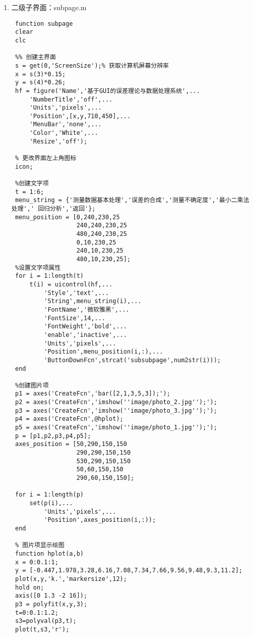 \begin{enumerate}
\begin{lstlisting}
 % 显示学校名称PNG图片函数
 function school_logo(a,b)
 [I,c,alpha] = imread('image/school_logo.png');
 h = imshow(I);
 set(h,'AlphaData',alpha);
 
 %% 主界面退出对话框
 function hexit(a,b)
 he = questdlg('你确定退出吗？','退出程序','是','否','否');
 if strcmp(he,'是')
     close;
     clear;
     clc;
 end;\end{lstlisting}
 \newpage
	\item 二级子界面：subpage.m
	\begin{lstlisting}
 function subpage
 clear
 clc
 
 %% 创建主界面
 s = get(0,'ScreenSize');% 获取计算机屏幕分辨率
 x = s(3)*0.15;
 y = s(4)*0.26;
 hf = figure('Name','基于GUI的误差理论与数据处理系统',...
     'NumberTitle','off',...
     'Units','pixels',...
     'Position',[x,y,710,450],...
     'MenuBar','none',...
     'Color','White',...
     'Resize','off');
 
 % 更改界面左上角图标
 icon;
 
 %创建文字项
 t = 1:6;
 menu_string = {'测量数据基本处理','误差的合成','测量不确定度','最小二乘法处理',' 回归分析','返回'};
 menu_position = [0,240,230,25
                  240,240,230,25
                  480,240,230,25
                  0,10,230,25
                  240,10,230,25
                  480,10,230,25];
 %设置文字项属性
 for i = 1:length(t)
     t(i) = uicontrol(hf,...
         'Style','text',...
         'String',menu_string(i),...
         'FontName','微软雅黑',...
         'FontSize',14,...
         'FontWeight','bold',...
         'enable','inactive',...
         'Units','pixels',...
         'Position',menu_position(i,:),...
         'ButtonDownFcn',strcat('subsubpage',num2str(i)));
 end
 
 %创建图片项
 p1 = axes('CreateFcn','bar([2,1,3,5,3]);');
 p2 = axes('CreateFcn','imshow(''image/photo_2.jpg'');');
 p3 = axes('CreateFcn','imshow(''image/photo_3.jpg'');');
 p4 = axes('CreateFcn',@hplot);
 p5 = axes('CreateFcn','imshow(''image/photo_1.jpg'');');
 p = [p1,p2,p3,p4,p5];
 axes_position = [50,290,150,150
                  290,290,150,150
                  530,290,150,150
                  50,60,150,150
                  290,60,150,150];
 
 for i = 1:length(p)
     set(p(i),...
         'Units','pixels',...
         'Position',axes_position(i,:));
 end
 
 % 图片项显示绘图
 function hplot(a,b)
 x = 0:0.1:1;
 y = [-0.447,1.978,3.28,6.16,7.08,7.34,7.66,9.56,9.48,9.3,11.2];
 plot(x,y,'k.','markersize',12);
 hold on;
 axis([0 1.3 -2 16]);
 p3 = polyfit(x,y,3);
 t=0:0.1:1.2;
 s3=polyval(p3,t);
 plot(t,s3,'r');\end{lstlisting}
\end{enumerate}
